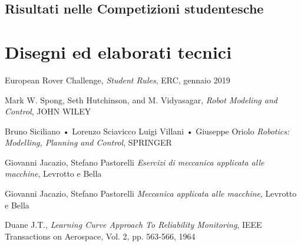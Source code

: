 \documentclass[%
corpo=11pt,
twoside,
 stile=classica,
oldstyle,
greek,%
]{toptesi}
\begin{document}
	\section{Risultati nelle Competizioni studentesche }

\backmatter
\chapter{Disegni ed elaborati tecnici}







\begin{thebibliography}{9}
 European Rover Challenge, \emph{Student Rules}, ERC, gennaio 2019

Mark W. Spong, Seth Hutchinson, and M. Vidyasagar, \emph{Robot Modeling and Control}, JOHN WILEY  

Bruno Siciliano • Lorenzo Sciavicco Luigi Villani • Giuseppe Oriolo \emph{Robotics: Modelling, Planning and Control}, SPRINGER

Giovanni Jacazio, Stefano Pastorelli \emph{Esercizi di meccanica applicata alle macchine}, Levrotto e Bella

Giovanni Jacazio, Stefano Pastorelli \emph{Meccanica applicata alle macchine}, Levrotto e Bella

 Duane J.T., \emph{Learning Curve Approach To Reliability 
		Monitoring}, IEEE Transactions on Aerospace, Vol. 2, pp. 563-566, 1964
\end{thebibliography}
\end{document}
